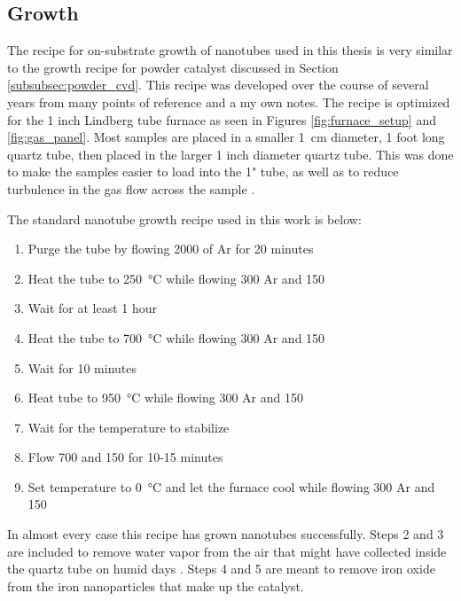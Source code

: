 \subsection{Growth}
\label{subsubsec:substrate_cvd}

The recipe for on-substrate growth of nanotubes used in this thesis is very similar to the growth recipe for powder catalyst discussed in Section \ref{subsubsec:powder_cvd}. This recipe was developed over the course of several years from many points of reference \cite{Kong1998, Kong1998a, Dirks2010, Huang2003, Huang2004, Zhang2013, Hong2005} and a my own notes. The recipe is optimized for the 1 inch Lindberg tube furnace as seen in Figures \ref{fig:furnace_setup} and \ref{fig:gas_panel}. Most samples are placed in a smaller \SI{1}{\centi\meter} diameter, 1 foot long quartz tube, then placed in the larger 1 inch diameter quartz tube. This was done to make the samples easier to load into the 1" tube, as well as to reduce turbulence in the gas flow across the sample \cite{Hong2005}. 

The standard nanotube growth recipe used in this work is below:

\begin{enumerate}
	\item Purge the tube by flowing \SI{2000}{\sccm} of Ar for 20 minutes
	\item Heat the tube to \SI{250}{\degreeCelsius} while flowing \SI{300}{\sccm} Ar and \SI{150}{\sccm} 
	\item Wait for at least 1 hour
	\item Heat the tube to \SI{700}{\degreeCelsius} while flowing \SI{300}{\sccm} Ar and \SI{150}{\sccm} 
	\item Wait for 10 minutes
	\item Heat tube to \SI{950}{\degreeCelsius} while flowing \SI{300}{\sccm} Ar and \SI{150}{\sccm} 
	\item Wait for the temperature to stabilize
	\item Flow \SI{700}{\sccm}  and \SI{150}{\sccm}  for 10-15 minutes
	\item Set temperature to \SI{0}{\degreeCelsius} and let the furnace cool while flowing \SI{300}{\sccm} Ar and \SI{150}{\sccm} 
\end{enumerate}

In almost every case this recipe has grown nanotubes successfully. Steps 2 and 3 are included to remove water vapor from the air that might have collected inside the quartz tube on humid days \cite{Dirks2010}. Steps 4 and 5 are meant to remove iron oxide from the iron nanoparticles that make up the catalyst. 

